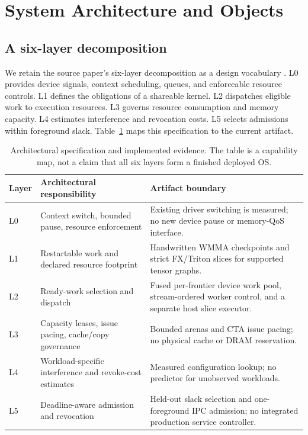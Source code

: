 \section{System Architecture and Objects}
\label{sec:architecture}
\subsection{A six-layer decomposition}
We retain the source paper's six-layer decomposition as a design vocabulary
\cite{Nourai2026GPUOS}. L0 provides device signals, context scheduling,
queues, and enforceable resource controls. L1 defines the obligations of a
shareable kernel. L2 dispatches eligible work to execution resources. L3
governs resource consumption and memory capacity. L4 estimates interference
and revocation costs. L5 selects admissions within foreground slack.
Table~\ref{tab:layers} maps this specification to the current artifact.

\begin{table}[t]
\centering\small
\begin{tabular}{p{}p{}p{}}
\toprule
Layer & Architectural responsibility & Artifact boundary \\
\midrule
L0 & Context switch, bounded pause, resource enforcement & Existing driver switching is measured; no new device pause or memory-QoS interface. \\
L1 & Restartable work and declared resource footprint & Handwritten WMMA checkpoints and strict FX/Triton slices for supported tensor graphs. \\
L2 & Ready-work selection and dispatch & Fused per-frontier device work pool, stream-ordered worker control, and a separate host slice executor. \\
L3 & Capacity leases, issue pacing, cache/copy governance & Bounded arenas and CTA issue pacing; no physical cache or DRAM reservation. \\
L4 & Workload-specific interference and revoke-cost estimates & Measured configuration lookup; no predictor for unobserved workloads. \\
L5 & Deadline-aware admission and revocation & Held-out slack selection and one-foreground IPC admission; no integrated production service controller. \\
\bottomrule
\end{tabular}
\caption{Architectural specification and implemented evidence. The table is
a capability map, not a claim that all six layers form a finished deployed OS.}
\label{tab:layers}
\end{table}

